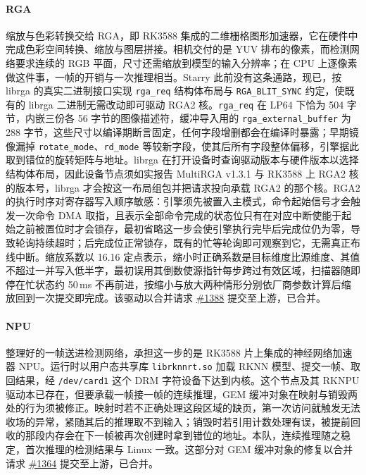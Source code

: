 \paragraph{RGA}
缩放与色彩转换交给 RGA，即 RK3588 集成的二维栅格图形加速器，它在硬件中完成色彩空间转换、缩放与图层拼接。相机交付的是 YUV 排布的像素，而检测网络要求连续的 RGB 平面，尺寸还需缩放到模型的输入分辨率；在 CPU 上逐像素做这件事，一帧的开销与一次推理相当。Starry 此前没有这条通路，现已，按 librga 的真实二进制接口实现 \texttt{rga\_req} 结构体布局与 \texttt{RGA\_BLIT\_SYNC} 约定，使既有的 librga 二进制无需改动即可驱动 RGA2 核。\texttt{rga\_req} 在 LP64 下恰为 504 字节，内嵌三份各 56 字节的图像描述符，缓冲导入用的 \texttt{rga\_external\_buffer} 为 288 字节，这些尺寸以编译期断言固定，任何字段增删都会在编译时暴露；早期镜像漏掉 \texttt{rotate\_mode}、\texttt{rd\_mode} 等较新字段，使其后所有字段整体偏移，引擎据此取到错位的旋转矩阵与地址。librga 在打开设备时查询驱动版本与硬件版本以选择结构体布局，因此设备节点须如实报告 MultiRGA v1.3.1 与 RK3588 上 RGA2 核的版本号，librga 才会按这一布局组包并把请求投向承载 RGA2 的那个核。RGA2 的执行时序对寄存器写入顺序敏感：引擎须先被置入主模式，命令起始信号才会触发一次命令 DMA 取指，且表示全部命令完成的状态位只有在对应中断使能于起始之前被置位时才会锁存，最初省略这一步会使引擎执行完毕后完成位仍为零，导致轮询持续超时；后完成位正常锁存，既有的忙等轮询即可观察到它，无需真正布线中断。缩放系数以 16.16 定点表示，缩小时正确系数是目标维度比源维度、其值不超过一并写入低半字，最初误用其倒数使源指针每步跨过有效区域，扫描器随即停在忙状态约 50\,ms 不再前进，按缩小与放大两种情形分别依厂商参数计算后缩放回到一次提交即完成。该驱动以合并请求 \href{https://github.com/rcore-os/tgoskits/pull/1388}{\#1388} 提交至上游，已合并。

\paragraph{NPU}
整理好的一帧送进检测网络，承担这一步的是 RK3588 片上集成的神经网络加速器 NPU。运行时以用户态共享库 \texttt{librknnrt.so} 加载 RKNN 模型、提交一帧、取回结果，经 \texttt{/dev/card1} 这个 DRM 字符设备下达到内核。这个节点及其 RKNPU 驱动本已存在，但要承载一帧接一帧的连续推理，GEM 缓冲对象在映射与销毁两处的行为须被修正。映射时若不正确处理这段区域的缺页，第一次访问就触发无法收场的异常，紧随其后的推理取不到输入；销毁时若引用计数处理有误，被提前回收的那段内存会在下一帧被再次创建时拿到错位的地址。本队，连续推理随之稳定，首次推理的检测结果与 Linux 一致。这部分对 GEM 缓冲对象的修复以合并请求 \href{https://github.com/rcore-os/tgoskits/pull/1364}{\#1364} 提交至上游，已合并。

